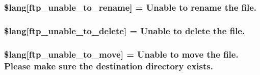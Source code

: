 \subsubsection[{\$lang}]{\setlength{\rightskip}{0pt plus 5cm}\$lang\mbox{[}\textquotesingle{}ftp\+\_\+unable\+\_\+to\+\_\+rename\textquotesingle{}\mbox{]} = \textquotesingle{}Unable to rename the file.\textquotesingle{}}\label{system_2language_2english_2ftp__lang_8php_ae2715b036a8015f4da2841c15ab8db79}
\hypertarget{system_2language_2english_2ftp__lang_8php_a922b1d7a3667e2cacb0873788e548dca}{}
\subsubsection[{\$lang}]{\setlength{\rightskip}{0pt plus 5cm}\$lang\mbox{[}\textquotesingle{}ftp\+\_\+unable\+\_\+to\+\_\+delete\textquotesingle{}\mbox{]} = \textquotesingle{}Unable to delete the file.\textquotesingle{}}\label{system_2language_2english_2ftp__lang_8php_a922b1d7a3667e2cacb0873788e548dca}
\hypertarget{system_2language_2english_2ftp__lang_8php_a72178091982e6697b12337601213fa76}{}
\subsubsection[{\$lang}]{\setlength{\rightskip}{0pt plus 5cm}\$lang\mbox{[}\textquotesingle{}ftp\+\_\+unable\+\_\+to\+\_\+move\textquotesingle{}\mbox{]} = \textquotesingle{}Unable to move the file. Please make sure the destination directory exists.\textquotesingle{}}\label{system_2language_2english_2ftp__lang_8php_a72178091982e6697b12337601213fa76}
